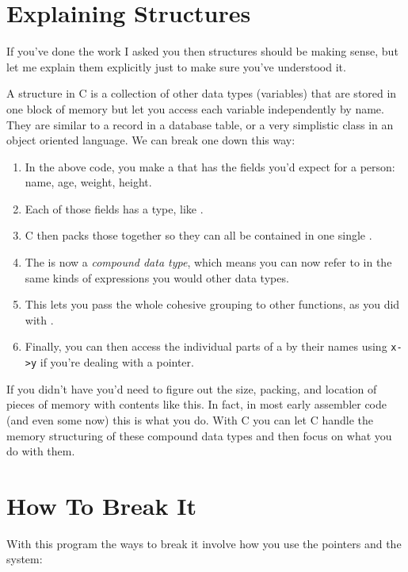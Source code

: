 \section{Explaining Structures}

If you've done the work I asked you then structures should be
making sense, but let me explain them explicitly just to make
sure you've understood it.

A structure in C is a collection of other data types (variables)
that are stored in one block of memory but let you access each
variable independently by name.  They are similar to a record
in a database table, or a very simplistic class in an object
oriented language.  We can break one down this way:

\begin{enumerate}
\item In the above code, you make a  that has the fields 
    you'd expect for a person: name, age, weight, height.
\item Each of those fields has a type, like .
\item C then packs those together so they can all be contained in 
    one single .
\item The  is now a \emph{compound data type}, which
    means you can now refer to  in the same kinds
    of expressions you would other data types.
\item This lets you pass the whole cohesive grouping to other
    functions, as you did with .
\item Finally, you can then access the individual parts of a
     by their names using \verb|x->y| if you're
    dealing with a pointer.
\end{enumerate}

If you didn't have  you'd need to figure out
the size, packing, and location of pieces of memory with
contents like this.  In fact, in most early assembler code
(and even some now) this is what you do.  With C you can 
let C handle the memory structuring of these compound data types
and then focus on what you do with them.


\section{How To Break It}

With this program the ways to break it involve how you use
the pointers and the  system:

